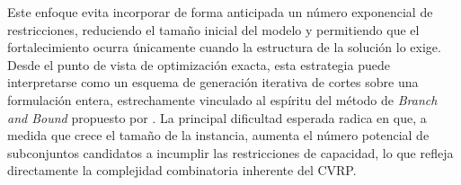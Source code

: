 Este enfoque evita incorporar de forma anticipada un número exponencial de
restricciones, reduciendo el tamaño inicial del modelo y permitiendo que el
fortalecimiento ocurra únicamente cuando la estructura de la solución lo exige. Desde
el punto de vista de optimización exacta, esta estrategia puede interpretarse como un
esquema de generación iterativa de cortes sobre una formulación entera, estrechamente
vinculado al espíritu del método de \textit{Branch and Bound} propuesto por
\textcite{laporte1983branch}. La principal dificultad esperada radica en que, a medida
que crece el tamaño de la instancia, aumenta el número potencial de subconjuntos
candidatos a incumplir las restricciones de capacidad, lo que refleja directamente la
complejidad combinatoria inherente del CVRP.